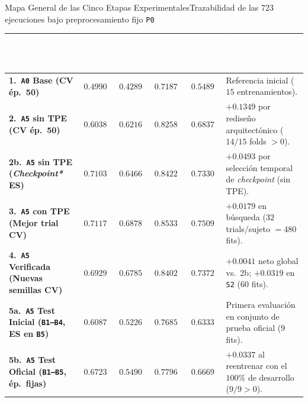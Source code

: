 \begin{frame}{Mapa General de las Cinco Etapas Experimentales}{Trazabilidad de las 723 ejecuciones bajo preprocesamiento fijo \texttt{P0} \cite{rodas_valencia_tpe_ecog}}
  \vspace{1mm}
  \centering
  \renewcommand{\arraystretch}{1.22}
  \setlength{\tabcolsep}{4.5pt}
  \begin{tabular}{@{} l c c c c l @{}}
    \toprule
    \rowcolor{ipnDark}
    \textcolor{white}{\textbf{Etapa Experimental (\texttt{P0} fijo)}} &
    \textcolor{white}{\textbf{Sujeto 1}} &
    \textcolor{white}{\textbf{Sujeto 2}} &
    \textcolor{white}{\textbf{Sujeto 3}} &
    \textcolor{white}{\textbf{Media Global}} &
    \textcolor{white}{\textbf{Cambio / Interpretaci\'on Metodol\'ogica}} \\
    \midrule
    \textbf{1.\ \texttt{A0} Base (CV \'ep.\ 50)} & $0.4990$ & $0.4289$ & $0.7187$ & $\mathbf{0.5489}$ & Referencia inicial ($15$ entrenamientos). \\
    \rowcolor{rowLight}
    \textbf{2.\ \texttt{A5} sin TPE (CV \'ep.\ 50)} & $0.6038$ & $0.6216$ & $0.8258$ & $\mathbf{0.6837}$ & $\mathbf{+0.1349}$ por redise\~no arquitect\'onico ($14/15$ folds $>0$). \\
    \textbf{2b.\ \texttt{A5} sin TPE (\textit{Checkpoint*} ES)} & $0.7103$ & $0.6466$ & $0.8422$ & $\mathbf{0.7330}$ & $\mathbf{+0.0493}$ por selecci\'on temporal de \textit{checkpoint} (sin TPE). \\
    \rowcolor{rowLight}
    \textbf{3.\ \texttt{A5} con TPE (Mejor trial CV)} & $0.7117$ & $0.6878$ & $0.8533$ & $\mathbf{0.7509}$ & $\mathbf{+0.0179}$ en b\'usqueda ($32$ trials/sujeto $= 480$ fits). \\
    \textbf{4.\ \texttt{A5} Verificada (Nuevas semillas CV)} & $0.6929$ & $0.6785$ & $0.8402$ & $\mathbf{0.7372}$ & $\mathbf{+0.0041}$ neto global vs.\ 2b; $\mathbf{+0.0319}$ en \texttt{S2} ($60$ fits). \\
    \midrule
    \rowcolor{rowLight}
    \textbf{5a.\ \texttt{A5} Test Inicial (\texttt{B1--B4}, ES en \texttt{B5})} & $0.6087$ & $0.5226$ & $0.7685$ & $\mathbf{0.6333}$ & Primera evaluaci\'on en conjunto de prueba oficial ($9$ fits). \\
    \rowcolor{rowHighlight}
    \textbf{5b.\ \texttt{A5} Test Oficial (\texttt{B1--B5}, \'ep.\ fijas)} & $\mathbf{0.6723}$ & $\mathbf{0.5490}$ & $\mathbf{0.7796}$ & $\mathbf{0.6669}$ & $\mathbf{+0.0337}$ al reentrenar con el $100\%$ de desarrollo ($9/9 > 0$). \\
    \bottomrule
  \end{tabular}
\end{frame}

